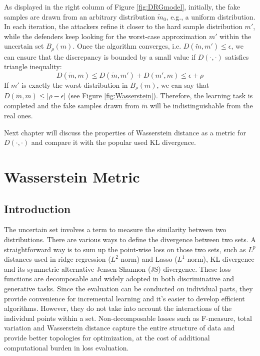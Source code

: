 \documentclass{article}
\begin{document}
As displayed in the right column of Figure \ref{fig:DRGmodel}, initially, the fake samples are drawn from an arbitrary distribution $\tilde{m}_0$, e.g., a uniform distribution. In each iteration, the attackers refine it closer to the hard sample distribution $m'$, while the defenders keep looking for the worst-case approximation $m'$ within the uncertain set $B_\rho(m)$. Once the algorithm converges, i.e. $D(\tilde{m}, m') \leq \epsilon$, we can ensure that the discrepancy is bounded by a small value if $D(\cdot,\cdot)$ satisfies triangle inequality:
\begin{equation}
D(\tilde{m}, m) \leq D(\tilde{m}, m') + D(m',m) \leq \epsilon + \rho
\end{equation}
If $m'$ is exactly the worst distribution in $B_\rho(m)$, we can say that $D(\tilde{m}, m) \leq |\rho - \epsilon|$ (see Figure \ref{fig:Wasserstein}).
Therefore, the learning task is completed and the fake samples drawn from $\tilde{m}$ will be indistinguishable from the real ones.

Next chapter will discuss the properties of Wasserstein distance as a metric for $D(\cdot,\cdot)$ and compare it with the popular used KL divergence.

\newpage



\section{Wasserstein Metric}
\label{Sec:Wasserstein}

\subsection{Introduction}
The uncertain set involves a term to measure the similarity between two distributions. There are various ways to define the divergence between two sets. A straightforward way is to sum up the point-wise loss on those two sets, such as $L^p$ distances used in ridge regression ($L^2$-norm) and Lasso ($L^1$-norm), KL divergence and its symmetric alternative Jensen-Shannon (JS) divergence. These loss functions are decomposable and widely adopted in both discriminative and generative tasks. Since the evaluation can be conducted on individual parts, they provide convenience for incremental learning and it's easier to develop efficient algorithms. However, they do not take into account the interactions of the individual points within a set. Non-decomposable losses such as F-measure, total variation and Wasserstein distance capture the entire structure of data and provide better topologies for optimization, at the cost of additional computational burden in loss evaluation.
\end{document}
